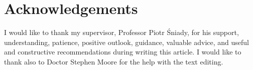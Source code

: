 \documentclass[submission]{FPSAC2021}
\begin{document}
\section*{Acknowledgements}

I would like to thank my supervisor, Professor Piotr
Śniady, for his support, understanding, patience, 
positive outlook, guidance, valuable advice, and 
useful and constructive recommendations during
writing this article. I would like to thank also 
to Doctor Stephen Moore for the help with the 
text editing.

\printbibliography 
\end{document}
